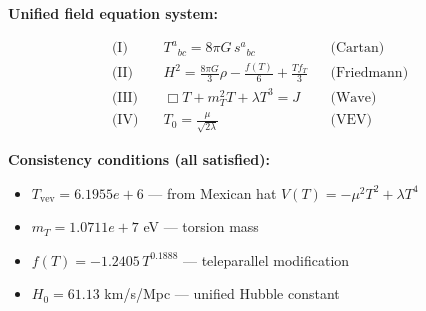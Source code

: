 
\textbf{Unified field equation system:}

\begin{align}
  \text{(I)} \quad & T^a{}_{bc} = 8\pi G \, s^a{}_{bc} && \text{(Cartan)} \\
  \text{(II)} \quad & H^2 = \frac{8\pi G}{3}\rho - \frac{f(T)}{6} + \frac{Tf_T}{3} && \text{(Friedmann)} \\
  \text{(III)} \quad & \Box T + m_T^2 T + \lambda T^3 = J && \text{(Wave)} \\
  \text{(IV)} \quad & T_0 = \frac{\mu}{\sqrt{2\lambda}} && \text{(VEV)}
\end{align}

\textbf{Consistency conditions (all satisfied):}
\begin{itemize}
  \item $T_{\text{vev}} = 6.1955e+6$ — from Mexican hat $V(T) = -\mu^2 T^2 + \lambda T^4$
  \item $m_T = 1.0711e+7$ eV — torsion mass
  \item $f(T) = -1.2405 \, T^{0.1888}$ — teleparallel modification
  \item $H_0 = 61.13$ km/s/Mpc — unified Hubble constant
\end{itemize}